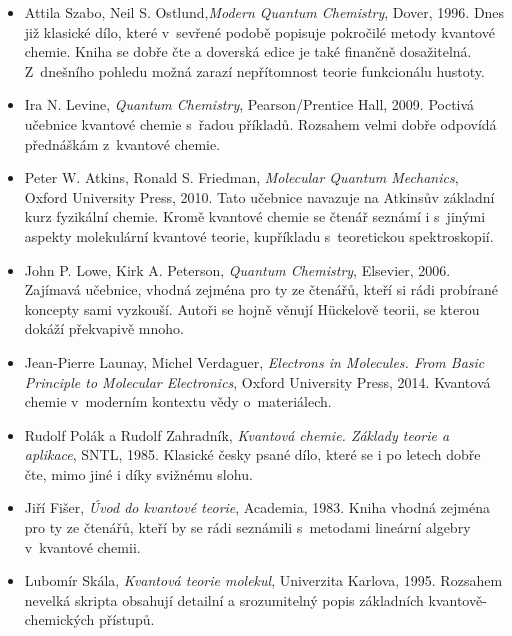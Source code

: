 \begin{itemize}

\item Attila Szabo, Neil S. Ostlund,\textit{Modern Quantum Chemistry}, Dover, 1996. Dnes již klasické dílo, které v~sevřené podobě popisuje pokročilé metody kvantové chemie. Kniha se dobře čte a doverská edice je také finančně dosažitelná. Z~dnešního pohledu možná zarazí nepřítomnost teorie funkcionálu hustoty. 
\item Ira N. Levine, \textit{Quantum Chemistry}, Pearson/Prentice Hall, 2009. Poctivá učebnice kvantové chemie s~řadou příkladů. Rozsahem velmi dobře odpovídá přednáškám z~kvantové chemie. 
\item Peter W. Atkins, Ronald S. Friedman, \textit{Molecular Quantum Mechanics}, Oxford University Press, 2010. Tato učebnice navazuje na Atkinsův základní kurz fyzikální chemie. Kromě kvantové chemie se čtenář seznámí i s~jinými aspekty molekulární kvantové teorie, kupříkladu s~teoretickou spektroskopií.  
\item John P. Lowe, Kirk A. Peterson, \textit{Quantum Chemistry}, Elsevier, 2006. Zajímavá učebnice, vhodná zejména pro ty ze čtenářů, kteří si rádi probírané koncepty sami vyzkouší. Autoři se hojně věnují H\"uckelově teorii, se kterou dokáží překvapivě mnoho.
\item Jean-Pierre Launay, Michel Verdaguer, \textit{Electrons in Molecules. From Basic Principle to Molecular Electronics}, Oxford University Press, 2014. Kvantová chemie v~moderním kontextu vědy o~materiálech. 
\item Rudolf Polák a Rudolf Zahradník, \textit{Kvantová chemie. Základy teorie a aplikace}, SNTL, 1985. Klasické česky psané dílo, které se i po letech dobře čte, mimo jiné i díky svižnému slohu.
\item Jiří Fišer, \textit{Úvod do kvantové teorie}, Academia, 1983. Kniha vhodná zejména pro ty ze čtenářů, kteří by se rádi seznámili s~metodami lineární algebry v~kvantové chemii.
\item Lubomír Skála, \textit{Kvantová teorie molekul}, Univerzita Karlova, 1995. Rozsahem nevelká skripta obsahují detailní a srozumitelný popis základních kvantově-chemických přístupů.

\end{itemize}
